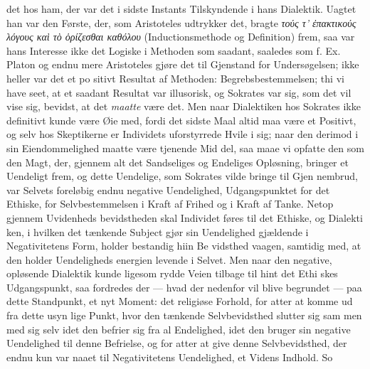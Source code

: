 \documentclass[12pt,a4paper]{book}
\newcommand{\gk}[1]{\textit{#1}}
\begin{document}
det hos ham, der var det i sidste Instants Tilskyndende i hans
Dialektik. Uagtet han var den Første, der, som Aristoteles
udtrykker det, bragte \gk{τούς τ' ἐπακτικούς λόγους καὶ τὸ ὁρίζεσθαι καθόλου}
(Inductionsmethode og Definition) frem, saa
var hans Interesse ikke det Logiske i Methoden som saadant,
saaledes som f. Ex. Platon og endnu mere Aristoteles gjøre
det til Gjenstand for Undersøgelsen; ikke heller var det et po\-%
sitivt Resultat af Methoden: Begrebsbestemmelsen; thi vi have
seet, at et saadant Resultat var illusorisk, og Sokrates var sig,
som det vil vise sig, bevidst, at det \emph{maatte} være det. Men
naar Dialektiken hos Sokrates ikke definitivt kunde være Øie\-%
med, fordi det sidste Maal altid maa være et Positivt, og selv
hos Skeptikerne er Individets uforstyrrede Hvile i sig; naar
den derimod i sin Eiendommelighed maatte være tjenende Mid\-%
del, saa maae vi opfatte den som den Magt, der, gjennem alt
det Sandseliges og Endeliges Opløsning, bringer et Uendeligt
frem, og dette Uendelige, som Sokrates vilde bringe til Gjen\-%
nembrud, var Selvets foreløbig endnu negative Uendelighed,
Udgangspunktet for det Ethiske, for Selvbestemmelsen i Kraft
af Frihed og i Kraft af Tanke. Netop gjennem Uvidenheds\-%
bevidstheden skal Individet føres til det Ethiske, og Dialekti\-%
ken, i hvilken det tænkende Subject gjør sin Uendelighed
gjældende i Negativitetens Form, holder bestandig hiin Be\-%
vidsthed vaagen, samtidig med, at den holder Uendeligheds\-%
energien levende i Selvet. Men naar den negative, opløsende
Dialektik kunde ligesom rydde Veien tilbage til hint det Ethi\-%
skes Udgangspunkt, saa fordredes der --- hvad der nedenfor
vil blive begrundet --- paa dette Standpunkt, et nyt Moment:
det religiøse Forhold, for atter at komme ud fra dette usyn\-%
lige Punkt, hvor den tænkende Selvbevidsthed slutter sig sam\-%
men med sig selv idet den befrier sig fra al Endelighed, idet
den bruger sin negative Uendelighed til denne Befrielse, og
for atter at give denne Selvbevidsthed, der endnu kun var
naaet til Negativitetens Uendelighed, et Videns Indhold. So\-%
\end{document}
